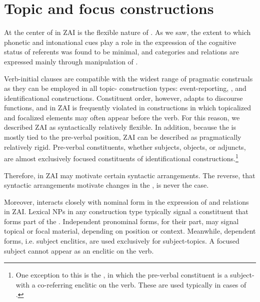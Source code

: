 

\section{Topic and focus constructions}

At the center of  in ZAI is the flexible nature of . As we saw, the extent to which phonetic and intonational cues play a role in the expression of the cognitive status of referents was found to be minimal, and  categories and relations are expressed mainly through manipulation of . 

Verb-initial clauses are compatible with the widest range of pragmatic construals as they can be employed in all topic- construction types: event-reporting, , and identificational constructions. Constituent order, however, adapts to discourse functions, and  in ZAI is frequently violated in constructions in which topicalized and focalized elements may often appear before the verb. For this reason, we described ZAI as syntactically relatively flexible. In addition, because the  is mostly tied to the pre-verbal position, ZAI can be described as pragmatically relatively rigid. Pre-verbal constituents, whether subjects, objects, or adjuncts, are almost exclusively focused constituents of identificational constructions.\footnote{One exception to this is the , in which the pre-verbal constituent is a subject- with a co-referring enclitic on the verb. These are used typically in cases of .} 

Therefore,  in ZAI may motivate certain syntactic arrangements. The reverse, that syntactic arrangements motivate changes in the , is never the case. 

Moreover,  interacts closely with nominal form in the expression of  and  relations in ZAI. Lexical NPs in any construction type typically signal a constituent that forms part of the . Independent pronominal forms, for their part, may signal topical or focal material, depending on position or context. Meanwhile, dependent forms, i.e. subject enclitics, are used exclusively for subject-topics. A focused subject cannot appear as an enclitic on the verb. 

